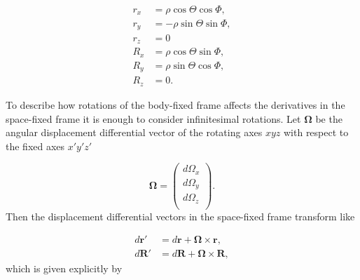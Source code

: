 \documentclass{article}
\numberwithin{equation}{section}
\numberwithin{figure}{section}
\begin{document}
\begin{equation}
\begin{aligned}
	r_x &= \rho \cos\Theta\cos\Phi,\\
	r_y &= -\rho \sin\Theta\sin\Phi,\\
	r_z &= 0\\
	R_x &= \rho \cos\Theta\sin\Phi,\\
	R_y &= \rho \sin\Theta\cos\Phi,\\
	R_z &= 0.
\end{aligned}   
\end{equation}

To describe how rotations of the body-fixed frame affects the derivatives in the space-fixed frame it is enough to consider infinitesimal rotations.  Let $\mathbf{\Omega}$ be the angular displacement differential vector of the rotating axes $xyz$ with respect to the fixed axes $x'y'z'$

\begin{equation}
\mathbf{\Omega} =
\begin{pmatrix}
d\Omega_x\\
d\Omega_y\\
d\Omega_z\\
\end{pmatrix}.
\end{equation}
Then the displacement differential vectors in the space-fixed frame transform like


\begin{subequations}
\begin{align}
	d{\mathbf{r}}' &= d\mathbf{r} + \mathbf{\Omega} \times \mathbf{r},\\
	d{\mathbf{R}}' &= d\mathbf{R} + \mathbf{\Omega} \times \mathbf{R},
\end{align}
\end{subequations}   
which is given explicitly by
\end{document}
